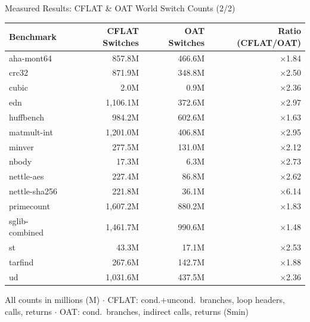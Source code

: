 \documentclass[aspectratio=169, 10pt]{beamer}
\begin{document}
\begin{frame}{Measured Results: CFLAT \& OAT World Switch Counts (2/2)}
    \begin{center}
    \renewcommand{\arraystretch}{1.15}
    \scriptsize
    \begin{tabular}{lrrr}
        \toprule
        \textbf{Benchmark} &
        \textbf{CFLAT Switches} &
        \textbf{OAT Switches} &
        \textbf{Ratio (CFLAT/OAT)} \\
        \midrule
        aha-mont64     &   857.8M &  466.6M & $\times$1.84 \\
        crc32          &   871.9M &  348.8M & $\times$2.50 \\
        cubic          &     2.0M &    0.9M & $\times$2.36 \\
        edn            & 1,106.1M &  372.6M & $\times$2.97 \\
        huffbench      &   984.2M &  602.6M & $\times$1.63 \\
        matmult-int    & 1,201.0M &  406.8M & $\times$2.95 \\
        minver         &   277.5M &  131.0M & $\times$2.12 \\
        nbody          &    17.3M &    6.3M & $\times$2.73 \\
        nettle-aes     &   227.4M &   86.8M & $\times$2.62 \\
        nettle-sha256  &   221.8M &   36.1M & $\times$6.14 \\
        primecount     & 1,607.2M &  880.2M & $\times$1.83 \\
        sglib-combined & 1,461.7M &  990.6M & $\times$1.48 \\
        st             &    43.3M &   17.1M & $\times$2.53 \\
        tarfind        &   267.6M &  142.7M & $\times$1.88 \\
        ud             & 1,031.6M &  437.5M & $\times$2.36 \\
        \bottomrule
    \end{tabular}
    \end{center}
    \vspace{2pt}
    \centering\tiny
    All counts in millions (M) $\cdot$
    CFLAT: cond.+uncond.\ branches, loop headers, calls, returns $\cdot$
    OAT: cond.\ branches, indirect calls, returns (Smin)
\end{frame}
\end{document}
